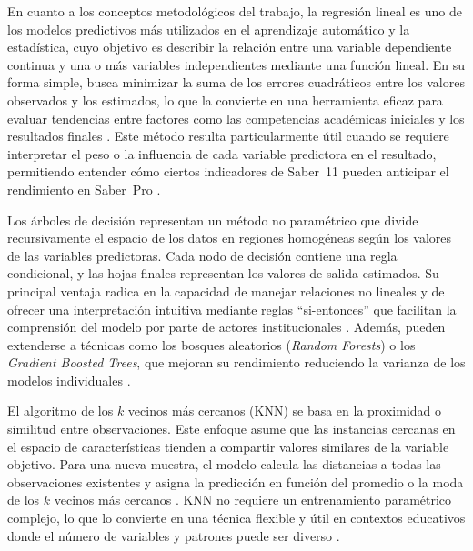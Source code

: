 En cuanto a los conceptos metodológicos del trabajo, la regresión lineal es uno de los modelos predictivos
más utilizados en el aprendizaje automático y la estadística, cuyo objetivo es describir la relación entre
una variable dependiente continua y una o más variables independientes mediante una función lineal. En
su forma simple, busca minimizar la suma de los errores cuadráticos entre los valores observados y los
estimados, lo que la convierte en una herramienta eficaz para evaluar tendencias entre factores como las
competencias académicas iniciales y los resultados finales \cite{google2025linear}. Este método resulta particularmente
útil cuando se requiere interpretar el peso o la influencia de cada variable predictora en el resultado,
permitiendo entender cómo ciertos indicadores de Saber~11 pueden anticipar el rendimiento en Saber~Pro
\cite{google2025linear}.

Los árboles de decisión representan un método no paramétrico que divide recursivamente el espacio de
los datos en regiones homogéneas según los valores de las variables predictoras. Cada nodo de decisión
contiene una regla condicional, y las hojas finales representan los valores de salida estimados. Su principal
ventaja radica en la capacidad de manejar relaciones no lineales y de ofrecer una interpretación intuitiva
mediante reglas ``si-entonces'' que facilitan la comprensión del modelo por parte de actores institucionales
\cite{mienye2023survey}. Además, pueden extenderse a técnicas como los bosques aleatorios (\textit{Random Forests})
o los \textit{Gradient Boosted Trees}, que mejoran su rendimiento reduciendo la varianza de los modelos
individuales \cite{mienye2023survey}.

El algoritmo de los $k$ vecinos más cercanos (KNN) se basa en la proximidad o similitud entre
observaciones. Este enfoque asume que las instancias cercanas en el espacio de características tienden a
compartir valores similares de la variable objetivo. Para una nueva muestra, el modelo calcula las distancias
a todas las observaciones existentes y asigna la predicción en función del promedio o la moda de los $k$
vecinos más cercanos \cite{bhatia2010survey}. KNN no requiere un entrenamiento paramétrico complejo, lo que lo
convierte en una técnica flexible y útil en contextos educativos donde el número de variables y patrones
puede ser diverso \cite{bhatia2010survey}.

